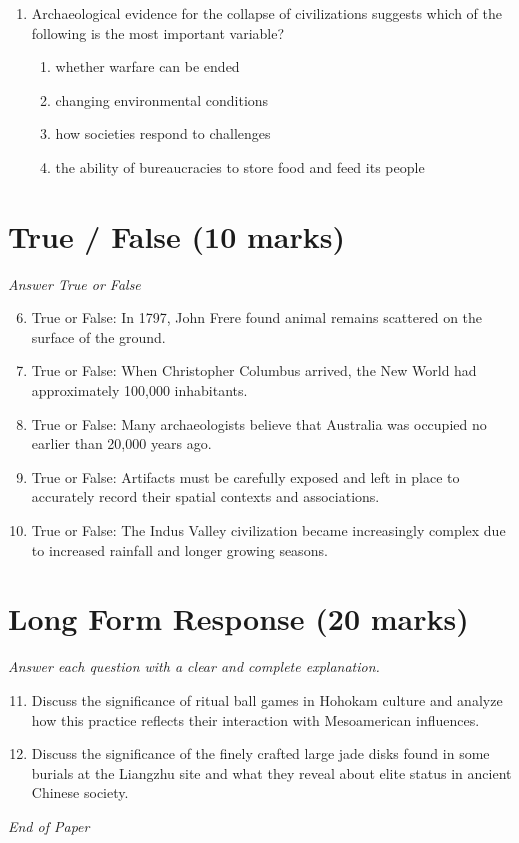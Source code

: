 \documentclass[12pt]{article}
\begin{document}
\begin{enumerate}[label=\arabic*.]
\begin{enumerate}[label=(\alph*)]
\end{enumerate}
\item Archaeological evidence for the collapse of civilizations suggests which of the following is the most important variable?
\begin{enumerate}[label=(\alph*)]
    \item whether warfare can be ended
    \item changing environmental conditions
    \item how societies respond to challenges
    \item the ability of bureaucracies to store food and feed its people
\end{enumerate}
\end{enumerate}

\section*{True / False (10 marks)}
\textit{Answer True or False}
\begin{enumerate}[label=\arabic*.]
\setcounter{enumi}{5}
\item True or False: In 1797, John Frere found animal remains scattered on the surface of the ground.
\item True or False: When Christopher Columbus arrived, the New World had approximately 100,000 inhabitants.
\item True or False: Many archaeologists believe that Australia was occupied no earlier than 20,000 years ago.
\item True or False: Artifacts must be carefully exposed and left in place to accurately record their spatial contexts and associations.
\item True or False: The Indus Valley civilization became increasingly complex due to increased rainfall and longer growing seasons.
\end{enumerate}

\section*{Long Form Response (20 marks)}
\textit{Answer each question with a clear and complete explanation.}
\begin{enumerate}[label=\arabic*.]
\setcounter{enumi}{10}
\item Discuss the significance of ritual ball games in Hohokam culture and analyze how this practice reflects their interaction with Mesoamerican influences.
\item Discuss the significance of the finely crafted large jade disks found in some burials at the Liangzhu site and what they reveal about elite status in ancient Chinese society.
\end{enumerate}

\vfill
\noindent\textit{End of Paper}
\end{document}
